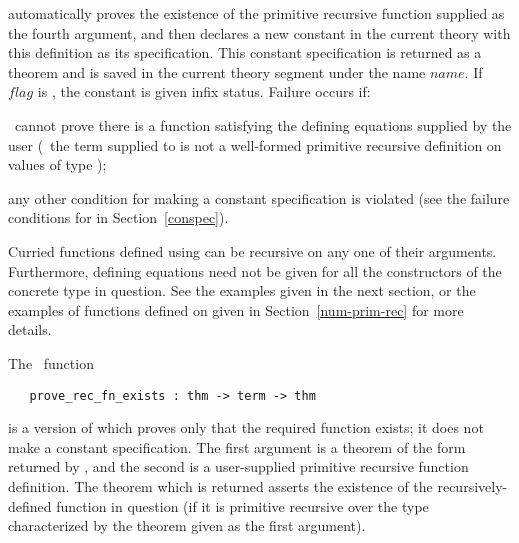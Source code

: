 \noindent  automatically proves the existence of the primitive recursive
function supplied as the fourth argument,
and then declares a new constant in the current theory
with this definition as its
specification. This constant specification is returned as a theorem
and is saved in the current theory segment under the name
$name$.
If $flag$ is , the constant is given infix status.
Failure occurs if:

\begin{myenumerate}
\item \HOL\ cannot prove there is a function
satisfying the defining equations supplied by the user
(\ie\ the term supplied to 
 is not a well-formed primitive recursive definition on values
of type );
\item any other condition for making a constant specification is violated
(see the failure conditions for  in
Section~\ref{conspec}).
\end{myenumerate}

Curried
functions defined using  can be
recursive on any one of their arguments.  Furthermore, defining equations need
not be given for all the constructors of the concrete type in question.  See
the examples given in the next section, or the examples of functions
defined on  given in Section~\ref{num-prim-rec} for more details.

The \ML\ function

\begin{boxed}
\begin{verbatim}
   prove_rec_fn_exists : thm -> term -> thm
\end{verbatim}\end{boxed}

\noindent is a version of  which proves only
that the required function exists; it does not make a constant specification.
The first argument is a theorem of the form returned by ,
and the second is a user-supplied primitive recursive function definition.
The theorem which is returned asserts the existence of the recursively-defined
function in question (if it is primitive recursive over the type characterized
by the theorem given as the first argument).

